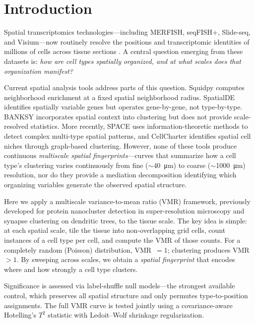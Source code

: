 \documentclass[11pt,a4paper]{article}
\begin{document}
\clearpage
\tableofcontents
\clearpage

\section{Introduction}
\label{sec:intro}

Spatial transcriptomics technologies---including MERFISH, seqFISH+, Slide-seq,
and Visium---now routinely resolve the positions and transcriptomic identities of
millions of cells across tissue sections \citep{Zhang2023, Fang2022}. A central question
emerging from these datasets is: \emph{how are cell types spatially organized,
and at what scales does that organization manifest?}

Current spatial analysis tools address parts of this question. Squidpy
\citep{Palla2022} computes neighborhood enrichment at a fixed spatial
neighborhood radius. SpatialDE \citep{Svensson2018} identifies spatially variable
genes but operates gene-by-gene, not type-by-type. BANKSY \citep{Singhal2024}
incorporates spatial context into clustering but does not provide
scale-resolved statistics. More recently, SPACE \citep{Schrom2025} uses information-theoretic methods to
detect complex multi-type spatial patterns, and CellCharter \citep{Varrone2024}
identifies spatial cell niches through graph-based clustering. However, none of
these tools produce continuous \emph{multiscale spatial fingerprints}---curves
that summarize how a cell type's clustering varies continuously from fine
($\sim$\SI{40}{\micro\meter}) to coarse ($\sim$\SI{1000}{\micro\meter})
resolution, nor do they provide a mediation decomposition identifying which
organizing variables generate the observed spatial structure.

Here we apply a multiscale variance-to-mean ratio (VMR) framework, previously
developed for protein nanocluster detection in super-resolution microscopy and
synapse clustering on dendritic trees, to the tissue scale. The key idea is
simple: at each spatial scale, tile the tissue into non-overlapping grid cells,
count instances of a cell type per cell, and compute the VMR of those counts.
For a completely random (Poisson) distribution, VMR~$= 1$; clustering produces
VMR~$> 1$. By sweeping across scales, we obtain a \emph{spatial fingerprint}
that encodes where and how strongly a cell type clusters.

Significance is assessed via label-shuffle null models---the strongest available
control, which preserves all spatial structure and only permutes type-to-position
assignments. The full VMR curve is tested jointly using a covariance-aware
Hotelling's $T^2$ statistic with Ledoit--Wolf shrinkage regularization.
\end{document}
